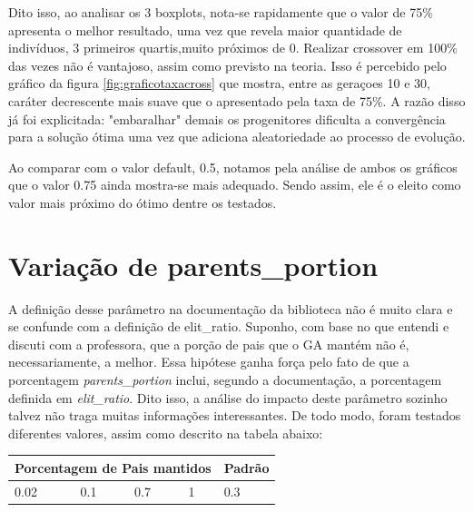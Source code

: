 \documentclass[12pt]{article}
\begin{document}
	Dito isso, ao analisar os 3 boxplots, nota-se rapidamente que o valor de 75\% apresenta o melhor resultado, uma vez que revela maior quantidade de indivíduos, 3 primeiros quartis,muito próximos de 0. Realizar crossover em 100\% das vezes não é vantajoso, assim como previsto na teoria. Isso é percebido pelo gráfico da figura \ref{fig:graficotaxacross} que mostra, entre as geraçoes 10 e 30, caráter decrescente mais suave que o apresentado pela taxa de 75\%. A razão disso já foi explicitada: "embaralhar" demais os progenitores dificulta a convergência para a solução ótima uma vez que adiciona aleatoriedade ao processo de evolução.
	
	Ao comparar com o valor default, 0.5, notamos pela análise de ambos os gráficos que o valor 0.75 ainda mostra-se mais adequado. Sendo assim, ele é o eleito como valor mais próximo do ótimo dentre os testados. 
	
	\section{Variação de parents\_portion}
	
	A definição desse parâmetro na documentação da biblioteca não é muito clara e se confunde com a definição de elit\_ratio. Suponho, com base no que entendi e discuti com a professora, que a porção de pais que o GA mantém não é, necessariamente, a melhor. Essa hipótese ganha força pelo fato de que a porcentagem \textit{parents\_portion} inclui, segundo a documentação, a porcentagem definida em \textit{elit\_ratio}. Dito isso, a análise do impacto deste parâmetro sozinho talvez não traga muitas informações interessantes. De todo modo, foram testados diferentes valores, assim como descrito na tabela abaixo:
	
	\begin{table}[H]
		\centering
		\begin{tabular}{|l|l|l|l|l|}
			\hline
			\multicolumn{4}{|l|}{Porcentagem de Pais mantidos} & Padrão \\ \hline
			0.02    & 0.1    & 0.7    & 1   &0.3 \\ \hline
		\end{tabular}
	\end{table}
	
\end{document}
